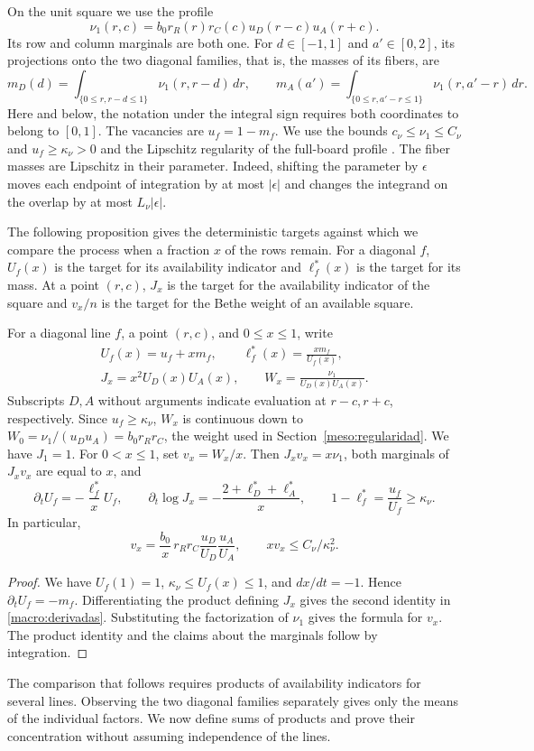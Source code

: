 On the unit square we use the profile
\[
 \nu_1(r,c)=b_0r_R(r)r_C(c)u_D(r-c)u_A(r+c).
\]
Its row and column marginals are both one. For $d\in[-1,1]$ and $a'\in[0,2]$, its projections onto
the two diagonal families, that is, the masses of its fibers, are
\[
 m_D(d)=\int_{\{0\le r,r-d\le1\}}\nu_1(r,r-d)\,dr,\qquad
 m_A(a')=\int_{\{0\le r,a'-r\le1\}}\nu_1(r,a'-r)\,dr .
\]
Here and below, the notation under the integral sign requires both coordinates to belong to $[0,1]$.
The vacancies are $u_f=1-m_f$. We use the bounds $c_\nu\le\nu_1\le C_\nu$ and $u_f\ge\kappa_\nu>0$
and the Lipschitz regularity of the full-board profile \cite[Theorems~1.1--1.3, Proposition~5.2 and
Theorem~7.7]{perfil}. The fiber masses are Lipschitz in their parameter. Indeed, shifting the
parameter by $\epsilon$ moves each endpoint of integration by at most $|\epsilon|$ and changes the
integrand on the overlap by at most $L_\nu|\epsilon|$.

The following proposition gives the deterministic targets against which we compare the process when
a fraction $x$ of the rows remain. For a diagonal $f$, $U_f(x)$ is the target for its availability
indicator and $\ell_f^*(x)$ is the target for its mass. At a point $(r,c)$, $J_x$ is the target for
the availability indicator of the square and $v_x/n$ is the target for the Bethe weight of an
available square.

\begin{proposicion}\label{macro:trayectoria}
For a diagonal line $f$, a point $(r,c)$, and $0\le x\le1$, write
\begin{gather*}
 U_f(x)=u_f+xm_f,\qquad \ell_f^*(x)=\frac{xm_f}{U_f(x)},\\
 J_x=x^2U_D(x)U_A(x),\qquad
 W_x=\frac{\nu_1}{U_D(x)U_A(x)}.
\end{gather*}
Subscripts $D,A$ without arguments indicate evaluation at $r-c,r+c$, respectively. Since $u_f\ge
\kappa_\nu$, $W_x$ is continuous down to $W_0=\nu_1/(u_Du_A)=b_0r_Rr_C$, the weight used in
Section~\ref{meso:regularidad}. We have $J_1=1$. For $0<x\le1$, set $v_x=W_x/x$. Then
$J_xv_x=x\nu_1$, both marginals of $J_xv_x$ are equal to $x$, and
\begin{equation}\label{macro:derivadas}
 \partial_t U_f=-\frac{\ell_f^*}{x}U_f,\qquad
 \partial_t\log J_x=-\frac{2+\ell_D^*+\ell_A^*}{x},\qquad
 1-\ell_f^*=\frac{u_f}{U_f}\ge\kappa_\nu .
\end{equation}
In particular,
\[
 v_x=\frac{b_0}{x}\,r_Rr_C\frac{u_D}{U_D}\frac{u_A}{U_A},
 \qquad xv_x\le C_\nu/\kappa_\nu^2 .
\]
\end{proposicion}
\begin{proof}
We have $U_f(1)=1$, $\kappa_\nu\le U_f(x)\le1$, and $dx/dt=-1$. Hence $\partial_t U_f=-m_f$.
Differentiating the product defining $J_x$ gives the second identity in \eqref{macro:derivadas}.
Substituting the factorization of $\nu_1$ gives the formula for $v_x$. The product identity and the
claims about the marginals follow by integration.
\end{proof}

The comparison that follows requires products of availability indicators for several lines.
Observing the two diagonal families separately gives only the means of the individual factors.
We now define sums of products and prove their concentration without assuming independence of the
lines.
